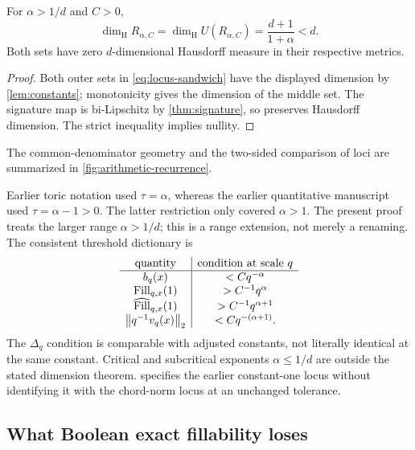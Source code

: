 \documentclass[11pt,a4paper]{article}
\begin{document}
\begin{theorem}
\label{thm:dimension}
For $\alpha>1/d$ and $C>0$,
\[
 \dim_{\mathrm H}R_{\alpha,C}
 =\dim_{\mathrm H}U(R_{\alpha,C})=\frac{d+1}{1+\alpha}<d.
\]
Both sets have zero $d$-dimensional Hausdorff measure in their respective
metrics.
\end{theorem}

\begin{proof}
Both outer sets in \cref{eq:locus-sandwich} have the displayed dimension
by \cref{lem:constants}; monotonicity gives the dimension of the middle
set.  The signature map is bi-Lipschitz by \cref{thm:signature}, so
preserves Hausdorff dimension.  The strict inequality implies nullity.
\end{proof}

The common-denominator geometry and the two-sided comparison of loci
are summarized in \cref{fig:arithmetic-recurrence}.


\begin{remark}\label{rem:exponents}
Earlier toric notation used $\tau=\alpha$, whereas the earlier
quantitative manuscript used $\tau=\alpha-1>0$.  The latter restriction
only covered $\alpha>1$.  The present proof treats the larger range
$\alpha>1/d$; this is a range extension, not merely a renaming.
The consistent threshold dictionary is
\[
\begin{array}{c|c}
 \text{quantity} & \text{condition at scale }q\\ \hline
 b_q(x) & <Cq^{-\alpha}\\
 \operatorname{Fill}_{q,x}(1) & >C^{-1}q^\alpha\\
 \operatorname{\widehat{Fill}}_{q,x}(1) & >C^{-1}q^{\alpha+1}\\
 \left\lVert q^{-1}v_q(x)\right\rVert_2 & <Cq^{-(\alpha+1)}.
\end{array}
\]
The $\Delta_q$ condition is comparable with adjusted constants, not
literally identical at the same constant.  Critical and subcritical
exponents $\alpha\leq1/d$ are outside the stated dimension theorem.
 specifies the earlier constant-one locus without
identifying it with the chord-norm locus at an unchanged tolerance.
\end{remark}

\subsection{What Boolean exact fillability loses}
\end{document}

